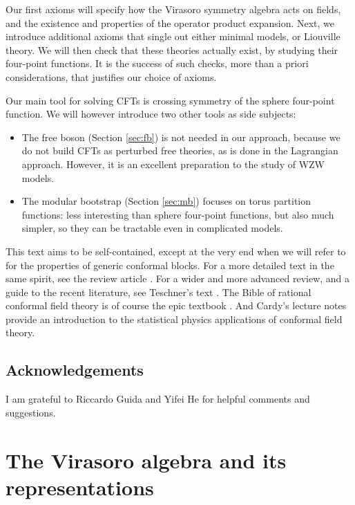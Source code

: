 \documentclass[12pt, a4paper]{article}
\theoremstyle{break}
\begin{document}
\begin{tcolorbox}
Our first axioms will specify how the Virasoro symmetry algebra acts on fields, and the existence and properties of the operator product expansion. 
Next, we introduce additional axioms that single out either minimal models, or Liouville theory.
We will then check that these theories actually exist, by studying their four-point functions.
It is the success of such checks, more than a priori considerations, that justifies our choice of axioms. 

Our main tool for solving CFTs is crossing symmetry of the sphere four-point function. We will however introduce two other tools as side subjects:
\begin{itemize}
 \item The free boson (Section \ref{sec:fb}) is not needed in our approach, because we do not build CFTs as perturbed free theories, as is done in the Lagrangian approach. However, it is an excellent preparation to the study of WZW models. 
 \item The modular bootstrap (Section \ref{sec:mb}) focuses on torus partition functions: less interesting than sphere four-point functions, but also much simpler, so they can be tractable even in complicated models. 
\end{itemize}
This text  aims to be self-contained, except at the very end when we will refer to \cite{zz90} for the properties of generic conformal blocks.
For a more detailed text in the same spirit, see the review article \cite{rib14}. For a wider and more advanced review, and a guide to the recent literature, see Teschner's text \cite{tes17}. 
The Bible of rational conformal field theory is of course the epic textbook \cite{fms97}. And Cardy's lecture notes \cite{car08} provide an introduction to the statistical physics applications of conformal field theory.

\subsection*{Acknowledgements}

I am grateful to Riccardo Guida and Yifei He for helpful comments and suggestions.

\end{tcolorbox}

\section{The Virasoro algebra and its representations}
\end{document}
